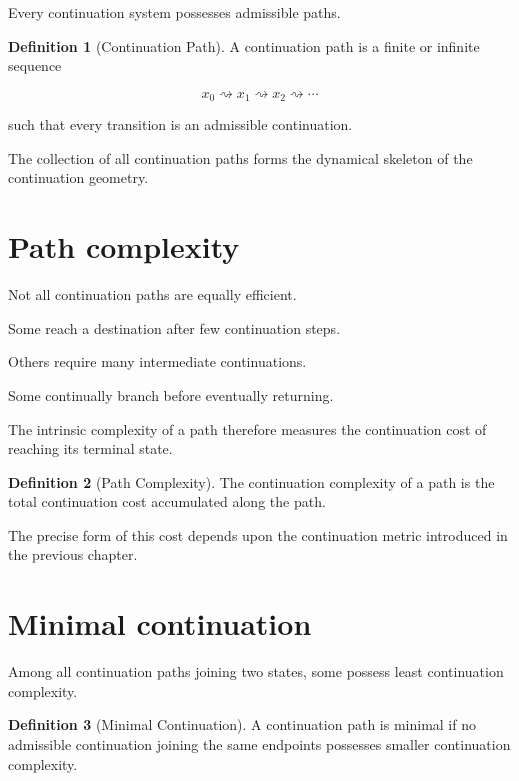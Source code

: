 \documentclass[13pt,openany]{book}
\theoremstyle{plain}
\theoremstyle{definition}
\newtheorem{definition}{Definition}[chapter]
\begin{document}
Every continuation system possesses admissible paths.

\begin{definition}[Continuation Path]
A continuation path is a finite or infinite sequence

\[
x_0
\rightsquigarrow
x_1
\rightsquigarrow
x_2
\rightsquigarrow
\cdots
\]

such that every transition is an admissible continuation.
\end{definition}

The collection of all continuation paths forms the dynamical skeleton of the continuation geometry.


\section{Path complexity}

Not all continuation paths are equally efficient.

Some reach a destination after few continuation steps.

Others require many intermediate continuations.

Some continually branch before eventually returning.

The intrinsic complexity of a path therefore measures the continuation cost of reaching its terminal state.

\begin{definition}[Path Complexity]

The continuation complexity of a path is the total continuation cost accumulated along the path.

\end{definition}

The precise form of this cost depends upon the continuation metric introduced in the previous chapter.


\section{Minimal continuation}

Among all continuation paths joining two states, some possess least continuation complexity.

\begin{definition}[Minimal Continuation]

A continuation path is minimal if no admissible continuation joining the same endpoints possesses smaller continuation complexity.

\end{definition}
\end{document}
